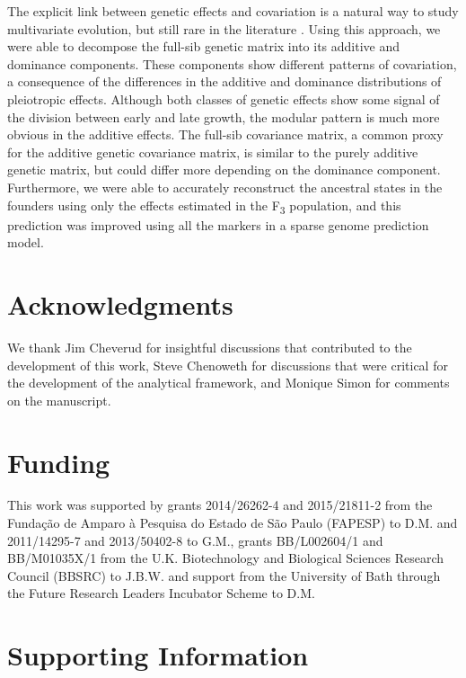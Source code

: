 \begin{refsection}
The explicit link between genetic effects and covariation is a natural way to
study multivariate evolution, but still rare in the literature
\parencite{Kelly2009-bj}. Using this approach, we were able to decompose the
full-sib genetic matrix into its additive and dominance components. These
components show different patterns of covariation, a consequence of the
differences in the additive and dominance distributions of pleiotropic
effects. Although both classes of genetic effects show some signal of the
division between early and late growth, the modular pattern is much more
obvious in the additive effects. The full-sib covariance matrix, a common
proxy for the additive genetic covariance matrix, is similar to the purely
additive genetic matrix, but could differ more depending on the dominance
component. Furthermore, we were able to accurately reconstruct the ancestral
states in the founders using only the effects estimated in the
F\textsubscript{3} population, and this prediction was improved using all the
markers in a sparse genome prediction model.


\section{Acknowledgments}

We thank Jim Cheverud for insightful discussions that contributed to the
development of this work, Steve Chenoweth for discussions that were critical
for the development of the analytical framework, and Monique Simon for
comments on the manuscript.


\section{Funding}

This work was supported by grants 2014/26262-4 and 2015/21811-2 from the
Fundação de Amparo à Pesquisa do Estado de São Paulo (FAPESP) to D.M.
and 2011/14295-7 and 2013/50402-8 to G.M., grants BB/L002604/1 and
BB/M01035X/1 from the U.K. Biotechnology and Biological Sciences
Research Council (BBSRC) to J.B.W. and support from the University of
Bath through the Future Research Leaders Incubator Scheme to D.M.

\printbibliography

\newpage

\section*{Supporting Information}


\end{refsection}
